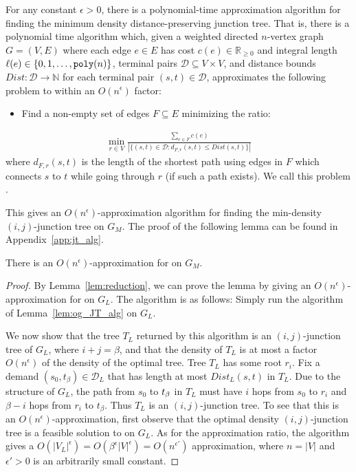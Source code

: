 \begin{lemma}
\label{lem:og_JT_alg}
    For any constant $\epsilon > 0$, there is a polynomial-time approximation algorithm for finding the minimum density distance-preserving junction tree. That is, there is a polynomial time algorithm which, given a weighted directed $n$-vertex graph $G = (V,E)$ where each edge $e \in E$ has cost $c(e) \in \mathbb{R}_{\geq 0}$ and integral length $\ell(e) \in \{0,1, \dots, \texttt{poly}(n)\}$, terminal pairs $\mathcal{D} \subseteq V \times V$, and distance bounds $Dist : \mathcal{D} \rightarrow \mathbb{N}$ for each terminal pair $(s,t) \in \mathcal{D}$, approximates the following problem to within an $O(n^\epsilon)$ factor:
    \begin{itemize}
        \item Find a non-empty set of edges $F \subseteq E$ minimizing the ratio:
    \end{itemize}
    \begin{align*}
        \min_{r \in V} \frac{\sum_{e \in F} c(e)}{|\{(s,t) \in \mathcal{D} : d_{F,r}(s,t) \leq Dist(s,t) \}|}
    \end{align*}
    where $d_{F,r}(s,t)$ is the length of the shortest path using edges in $F$ which connects $s$ to $t$ while going through $r$ (if such a path exists). We call this problem {\ljt}.
\end{lemma}

This gives an $O(n^\epsilon)$-approximation algorithm for finding the min-density $(i,j)$-junction tree on $G_M$. \iflong \else The proof of the following lemma can be found in Appendix~\ref{app:jt_alg}. \fi

\begin{lemma}
\label{lem:hop_JT_approx}
    There is an $O(n^\epsilon)$-approximation for {\jt} on $G_M$.
\end{lemma}
\iflong 
\begin{proof}
    By Lemma~\ref{lem:reduction}, we can prove the lemma by giving an $O(n^\epsilon)$-approximation for {\jt} on $G_L$. The algorithm is as follows: Simply run the algorithm of Lemma~\ref{lem:og_JT_alg} on $G_L$.

    We now show that the tree $T_L$ returned by this algorithm is an $(i,j)$-junction tree of $G_L$, where $i+j = \beta$, and that the density of $T_L$ is at most a factor $O(n^\epsilon)$ of the density of the optimal tree.
    Tree $T_L$ has some root $r_i$.
    Fix a demand $(s_0,t_\beta) \in \mathcal{D}_L$ that has length at most $Dist_L(s,t)$ in $T_L$. Due to the structure of $G_L$, the path from $s_0$ to $t_\beta$ in $T_L$ must have $i$ hops from $s_0$ to $r_i$ and $\beta - i$ hops from $r_i$ to $t_\beta$. Thus $T_L$ is an $(i,j)$-junction tree. To see that this is an $O(n^\epsilon)$-approximation, first observe that the optimal density $(i,j)$-junction tree is a feasible solution to {\ljt} on $G_L$. As for the approximation ratio, the algorithm gives a $O(|V_L|^\epsilon) = O(\beta^\epsilon |V|^\epsilon) = O(n^{\epsilon'})$ approximation, where $n = |V|$ and $\epsilon' > 0$ is an arbitrarily small constant.
\end{proof}
\else
\fi

